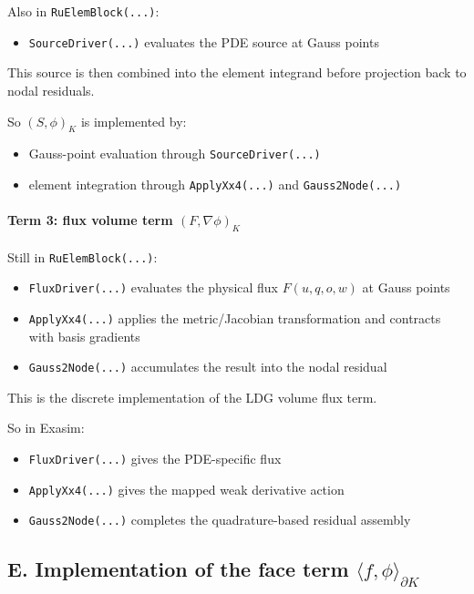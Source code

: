 \documentclass[11pt]{article}
\begin{document}
Also in \texttt{RuElemBlock(...)}:

\begin{itemize}[leftmargin=*]
\item \texttt{SourceDriver(...)} evaluates the PDE source at Gauss points
\end{itemize}

This source is then combined into the element integrand before projection back
to nodal residuals.

So $(S, \phi)_K$ is implemented by:

\begin{itemize}[leftmargin=*]
\item Gauss-point evaluation through \texttt{SourceDriver(...)}
\item element integration through \texttt{ApplyXx4(...)} and
\texttt{Gauss2Node(...)}
\end{itemize}

\paragraph{Term 3: flux volume term $(F, \nabla \phi)_K$}

Still in \texttt{RuElemBlock(...)}:

\begin{itemize}[leftmargin=*]
\item \texttt{FluxDriver(...)} evaluates the physical flux
$F(u,q,o,w)$ at Gauss points
\item \texttt{ApplyXx4(...)} applies the metric/Jacobian transformation and
contracts with basis gradients
\item \texttt{Gauss2Node(...)} accumulates the result into the nodal residual
\end{itemize}

This is the discrete implementation of the LDG volume flux term.

So in Exasim:

\begin{itemize}[leftmargin=*]
\item \texttt{FluxDriver(...)} gives the PDE-specific flux
\item \texttt{ApplyXx4(...)} gives the mapped weak derivative action
\item \texttt{Gauss2Node(...)} completes the quadrature-based residual assembly
\end{itemize}

\subsection*{E. Implementation of the face term $\langle \hat{f}, \phi \rangle_{\partial K}$}
\end{document}
